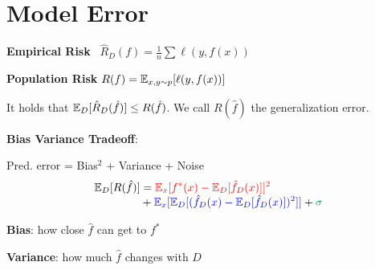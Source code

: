 \section*{Model Error}

\textbf{Empirical Risk} \quad \ $\hat R_D(f) = \frac{1}{n} \sum \mathcal \ell(y, f(x))$

\textbf{Population Risk} \quad $R(f) = \mathbb{E}_{x,y \sim p}[\ell(y, f(x))]$

It holds that $\mathbb{E}_D[\hat R_D (\hat f)] \leq R(\hat f)$. We call $R(\hat f)$ the generalization error.

\textbf{Bias Variance Tradeoff}:

Pred. error = \color{red} Bias$^2$ \color{black} + \color{blue} Variance \color{black} + \color{ForestGreen} Noise \color{black}
\begin{align*}
	\E_D[R(\hat f)] &= \color{red} \E_x[f^*(x) - \E_D[\hat f_D(x)]]^2 \\[-4pt]
 	&+ \color{blue} \E_x[\E_D[(\hat f_D(x) - \E_D[\hat f_D(x)])^2]] \color{black}  + \color{ForestGreen} \sigma
\end{align*}

\textbf{Bias}: how close $\hat f$ can get to $f^*$

\textbf{Variance}: how much $\hat f$ changes with $D$
